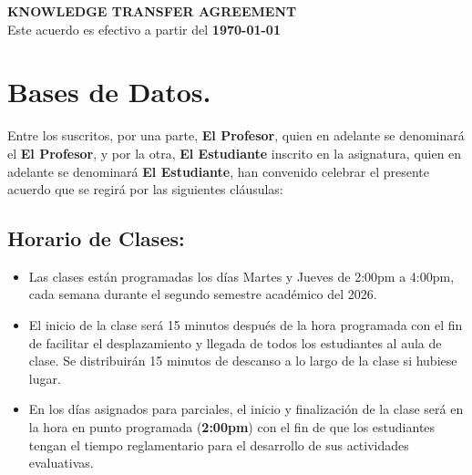 \documentclass[11pt]{article}
\begin{document}
{\centering
    \LARGE \textbf{KNOWLEDGE TRANSFER AGREEMENT} \\
    \vspace{0.5em}
    \small Este acuerdo es efectivo a partir del \textbf{\today}
\par}

\vspace{2em}

\section{Bases de Datos.}\label{contrato---administraciuxf3n-de-bases-de-datos.}
\vspace{2em}

\noindent Entre los suscritos, por una parte, \textbf{El Profesor}, quien en adelante se denominará el \textbf{El Profesor}, y por la otra, \textbf{El Estudiante} inscrito en la asignatura, quien en adelante se denominará \textbf{El Estudiante}, han convenido celebrar el presente acuerdo que se regirá por las siguientes cláusulas:

\vspace{1em}

\subsection{Horario de Clases:}\label{horario-de-clases}
\begin{itemize}
    \item Las clases están programadas los días Martes y Jueves de 2:00pm a 4:00pm, cada semana durante el segundo semestre académico del 2026.
    \item El inicio de la clase será 15 minutos después de la hora programada con el fin de facilitar el desplazamiento y llegada de todos los estudiantes al aula de clase. Se distribuirán 15 minutos de descanso a lo largo de la clase si hubiese lugar.
    \item En los días asignados para parciales, el inicio y finalización de la clase será en la hora en punto programada (\textbf{2:00pm}) con el fin de que los estudiantes tengan el tiempo reglamentario para el desarrollo de sus actividades evaluativas.
\end{itemize}
\end{document}
